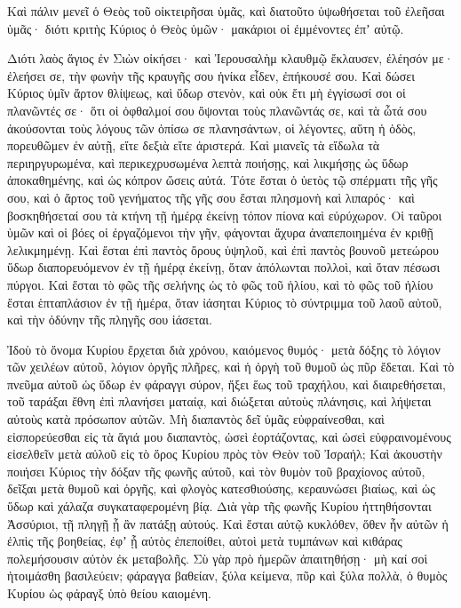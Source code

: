 {\par }{\PP {}Καὶ πάλιν μενεῖ ὁ Θεὸς τοῦ οἰκτειρῆσαι ὑμᾶς, καὶ διατοῦτο ὑψωθήσεται τοῦ ἐλεῆσαι ὑμᾶς· διότι κριτὴς Κύριος ὁ Θεὸς ὑμῶν· μακάριοι οἱ ἐμμένοντες ἐπʼ αὐτῷ.
\par }{\PP {}Διότι λαὸς ἅγιος ἐν Σιὼν οἰκήσει· καὶ Ἰερουσαλὴμ κλαυθμῷ ἔκλαυσεν, ἐλέησόν με· ἐλεήσει σε, τὴν φωνὴν τῆς κραυγῆς σου ἡνίκα εἶδεν, ἐπήκουσέ σου.
Καὶ δώσει Κύριος ὑμῖν ἄρτον θλίψεως, καὶ ὕδωρ στενὸν, καὶ οὐκ ἔτι μὴ ἐγγίσωσί σοι οἱ πλανῶντές σε· ὅτι οἱ ὀφθαλμοί σου ὄψονται τοὺς πλανῶντάς σε,
καὶ τὰ ὦτά σου ἀκούσονται τοὺς λόγους τῶν ὀπίσω σε πλανησάντων, οἱ λέγοντες, αὕτη ἡ ὁδὸς, πορευθῶμεν ἐν αὐτῇ, εἴτε δεξιὰ εἴτε ἀριστερά.
Καὶ μιανεῖς τὰ εἴδωλα τὰ περιηργυρωμένα, καὶ περικεχρυσωμένα λεπτὰ ποιήσῃς, καὶ λικμήσῃς ὡς ὕδωρ ἀποκαθημένης, καὶ ὡς κόπρον ὤσεις αὐτά.
Τότε ἔσται ὁ ὑετὸς τῷ σπέρματι τῆς γῆς σου, καὶ ὁ ἄρτος τοῦ γενήματος τῆς γῆς σου ἔσται πλησμονὴ καὶ λιπαρός· καὶ βοσκηθήσεταί σου τὰ κτήνη τῇ ἡμέρᾳ ἐκείνῃ τόπον πίονα καὶ εὐρύχωρον.
Οἱ ταῦροι ὑμῶν καὶ οἱ βόες οἱ ἐργαζόμενοι τὴν γῆν, φάγονται ἄχυρα ἀναπεποιημένα ἐν κριθῇ λελικμημένῃ.
Καὶ ἔσται ἐπὶ παντὸς ὄρους ὑψηλοῦ, καὶ ἐπὶ παντὸς βουνοῦ μετεώρου ὕδωρ διαπορευόμενον ἐν τῇ ἡμέρᾳ ἐκείνῃ, ὅταν ἀπόλωνται πολλοὶ, καὶ ὅταν πέσωσι πύργοι.
Καὶ ἔσται τὸ φῶς τῆς σελήνης ὡς τὸ φῶς τοῦ ἡλίου, καὶ τὸ φῶς τοῦ ἡλίου ἔσται ἑπταπλάσιον ἐν τῇ ἡμέρα, ὅταν ἰάσηται Κύριος τὸ σύντριμμα τοῦ λαοῦ αὐτοῦ, καὶ τὴν ὀδύνην τῆς πληγῆς σου ἰάσεται.
\par }{\PP {}Ἰδοὺ τὸ ὄνομα Κυρίου ἔρχεται διὰ χρόνου, καιόμενος θυμός· μετὰ δόξης τὸ λόγιον τῶν χειλέων αὐτοῦ, λόγιον ὀργῆς πλῆρες, καὶ ἡ ὀργὴ τοῦ θυμοῦ ὡς πῦρ ἔδεται.
Καὶ τὸ πνεῦμα αὐτοῦ ὡς ὕδωρ ἐν φάραγγι σύρον, ἥξει ἕως τοῦ τραχήλου, καὶ διαιρεθήσεται, τοῦ ταράξαι ἔθνη ἐπὶ πλανήσει ματαίᾳ, καὶ διώξεται αὐτοὺς πλάνησις, καὶ λήψεται αὐτοὺς κατὰ πρόσωπον αὐτῶν.
Μὴ διαπαντὸς δεῖ ὑμᾶς εὐφραίνεσθαι, καὶ εἰσπορεύεσθαι εἰς τὰ ἅγιά μου διαπαντὸς, ὡσεὶ ἑορτάζοντας, καὶ ὡσεὶ εὐφραινομένους εἰσελθεῖν μετὰ αὐλοῦ εἰς τὸ ὄρος Κυρίου πρὸς τὸν Θεὸν τοῦ Ἰσραήλ;
Καὶ ἀκουστὴν ποιήσει Κύριος τὴν δόξαν τῆς φωνῆς αὐτοῦ, καὶ τὸν θυμὸν τοῦ βραχίονος αὐτοῦ, δεῖξαι μετὰ θυμοῦ καὶ ὀργῆς, καὶ φλογὸς κατεσθιούσης, κεραυνώσει βιαίως, καὶ ὡς ὕδωρ καὶ χάλαζα συγκαταφερομένη βίᾳ.
Διὰ γὰρ τῆς φωνῆς Κυρίου ἡττηθήσονται Ἀσσύριοι, τῇ πληγῇ ᾗ ἂν πατάξῃ αὐτούς.
Καὶ ἔσται αὐτῷ κυκλόθεν, ὅθεν ἦν αὐτῶν ἡ ἐλπὶς τῆς βοηθείας, ἐφʼ ᾗ αὐτὸς ἐπεποίθει, αὐτοὶ μετὰ τυμπάνων καὶ κιθάρας πολεμήσουσιν αὐτὸν ἐκ μεταβολῆς.
Σὺ γὰρ πρὸ ἡμερῶν ἀπαιτηθήσῃ· μὴ καί σοὶ ἡτοιμάσθη βασιλεύειν; φάραγγα βαθείαν, ξύλα κείμενα, πῦρ καὶ ξύλα πολλὰ, ὁ θυμὸς Κυρίου ὡς φάραγξ ὑπὸ θείου καιομένη.

}
